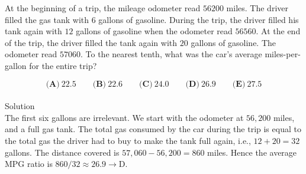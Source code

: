 

At the beginning of a trip, the mileage odometer read $ 56200$ miles. The driver filled the gas tank with  $ 6$ gallons of gasoline. During the trip, the driver filled his tank again with $ 12$ gallons of gasoline when the odometer read $ 56560$. At the end of the trip, the driver filled the tank again with $ 20$ gallons of gasoline. The odometer read $ 57060$. To the nearest tenth, what was the car's average miles-per-gallon for the entire trip?

\[ \textbf{(A)}\ 22.5 \qquad
\textbf{(B)}\ 22.6 \qquad
\textbf{(C)}\ 24.0 \qquad
\textbf{(D)}\ 26.9 \qquad
\textbf{(E)}\ 27.5
\]
\\
Solution
\\
The first six gallons are irrelevant. We start with the odometer at $56,200$ miles, and a full gas tank. The total gas consumed by the car during the trip is equal to the total gas the driver had to buy to make the tank full again, i.e., $12+20=32$ gallons. The distance covered is $57,060 - 56,200 = 860$ miles. Hence the average MPG ratio is $860 / 32 \approx 26.9 \rightarrow \boxed{\text{D}}$.
